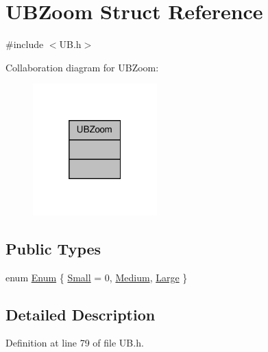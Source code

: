 \hypertarget{struct_u_b_zoom}{\section{U\-B\-Zoom Struct Reference}
\label{d9/dcf/struct_u_b_zoom}
}


{\ttfamily \#include $<$U\-B.\-h$>$}



Collaboration diagram for U\-B\-Zoom\-:
\nopagebreak
\begin{figure}[H]
\begin{center}
\leavevmode
\includegraphics[width=136pt]{db/d55/struct_u_b_zoom__coll__graph}
\end{center}
\end{figure}
\subsection*{Public Types}
\begin{DoxyCompactItemize}
\item 
enum \hyperlink{struct_u_b_zoom_a119069dae00f2d655bb143373d1954f7}{Enum} \{ \hyperlink{struct_u_b_zoom_a119069dae00f2d655bb143373d1954f7a00661f1d9c78b272f02928cfd6987cf3}{Small} =  0, 
\hyperlink{struct_u_b_zoom_a119069dae00f2d655bb143373d1954f7aa27ba67444fecbf1f0c6a18f4d45e89d}{Medium}, 
\hyperlink{struct_u_b_zoom_a119069dae00f2d655bb143373d1954f7aaf4113207fe448050bdf6877573a4328}{Large}
 \}
\end{DoxyCompactItemize}


\subsection{Detailed Description}


Definition at line 79 of file U\-B.\-h.



